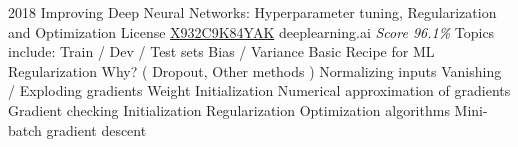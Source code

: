 \documentclass[11pt,a4paper]{moderncv}
\begin{document}
\cventry
    {2018}
    {Improving Deep Neural Networks: Hyperparameter tuning, Regularization and Optimization}
    {License
        \href{https://www.coursera.org/account/accomplishments/records/X932C9K84YAK}
        {X932C9K84YAK}
    }
    {deeplearning.ai}
    {\textit{Score 96.1\%}}
    {
        Topics include:                                                                                           %
            Train / Dev / Test sets                                                                               %
            Bias / Variance                                                                                       %
            Basic Recipe for ML                                                                                   %
            Regularization                                                                                        %
            Why? (                                                                                                %
                Dropout,                                                                                          %
                Other methods                                                                                     %
                )                                                                                                 %
            Normalizing inputs                                                                                    %
            Vanishing / Exploding gradients                                                                       %
            Weight Initialization                                                                                 %
            Numerical approximation of gradients                                                                  %
            Gradient checking                                                                                     %
            Initialization                                                                                        %
            Regularization                                                                                        %
            Optimization algorithms                                                                               %
            Mini-batch gradient descent                                                                           %
}
\end{document}
